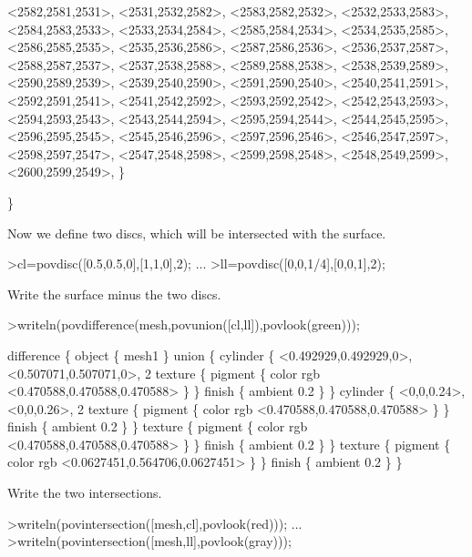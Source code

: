 \documentclass[a4paper,10pt]{article}
\begin{document}
\begin{eulernotebook}
\begin{euleroutput}
  <2582,2581,2531>,
  <2531,2532,2582>,
  <2583,2582,2532>,
  <2532,2533,2583>,
  <2584,2583,2533>,
  <2533,2534,2584>,
  <2585,2584,2534>,
  <2534,2535,2585>,
  <2586,2585,2535>,
  <2535,2536,2586>,
  <2587,2586,2536>,
  <2536,2537,2587>,
  <2588,2587,2537>,
  <2537,2538,2588>,
  <2589,2588,2538>,
  <2538,2539,2589>,
  <2590,2589,2539>,
  <2539,2540,2590>,
  <2591,2590,2540>,
  <2540,2541,2591>,
  <2592,2591,2541>,
  <2541,2542,2592>,
  <2593,2592,2542>,
  <2542,2543,2593>,
  <2594,2593,2543>,
  <2543,2544,2594>,
  <2595,2594,2544>,
  <2544,2545,2595>,
  <2596,2595,2545>,
  <2545,2546,2596>,
  <2597,2596,2546>,
  <2546,2547,2597>,
  <2598,2597,2547>,
  <2547,2548,2598>,
  <2599,2598,2548>,
  <2548,2549,2599>,
  <2600,2599,2549>,
  \}
  
  \}
\end{euleroutput}
\begin{eulercomment}
Now we define two discs, which will be intersected with the surface.
\end{eulercomment}
\begin{eulerprompt}
>cl=povdisc([0.5,0.5,0],[1,1,0],2); ...
>ll=povdisc([0,0,1/4],[0,0,1],2);
\end{eulerprompt}
\begin{eulercomment}
Write the surface minus the two discs.
\end{eulercomment}
\begin{eulerprompt}
>writeln(povdifference(mesh,povunion([cl,ll]),povlook(green)));
\end{eulerprompt}
\begin{euleroutput}
  difference \{ 
  object \{ mesh1 \}
  union \{ cylinder \{ <0.492929,0.492929,0>, <0.507071,0.507071,0>, 2
   texture \{ pigment \{ color rgb <0.470588,0.470588,0.470588> \}  \} 
   finish \{ ambient 0.2 \} 
   \}
  cylinder \{ <0,0,0.24>, <0,0,0.26>, 2
   texture \{ pigment \{ color rgb <0.470588,0.470588,0.470588> \}  \} 
   finish \{ ambient 0.2 \} 
   \}
   texture \{ pigment \{ color rgb <0.470588,0.470588,0.470588> \}  \} 
   finish \{ ambient 0.2 \} 
   \}
   texture \{ pigment \{ color rgb <0.0627451,0.564706,0.0627451> \}  \} 
   finish \{ ambient 0.2 \} 
   \}
\end{euleroutput}
\begin{eulercomment}
Write the two intersections.
\end{eulercomment}
\begin{eulerprompt}
>writeln(povintersection([mesh,cl],povlook(red))); ...
>writeln(povintersection([mesh,ll],povlook(gray)));
\end{eulerprompt}

\end{eulernotebook}
\end{document}
